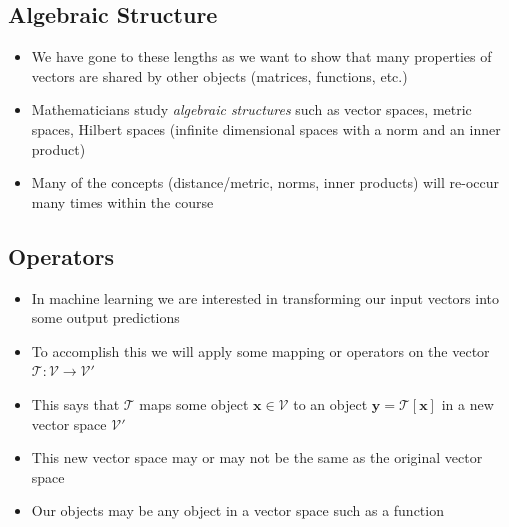 \begin{slide}
\section{Algebraic Structure}

\begin{PauseHighLight}
  \begin{itemize}
  \item We have gone to these lengths as we want to show that many
    properties of vectors are shared by other objects (matrices,
    functions, etc.)\pause
  \item Mathematicians study \textit{algebraic structures} such as
    vector spaces, metric spaces, Hilbert spaces (infinite dimensional
    spaces with a norm and an inner product)\pause
  \item Many of the concepts (distance/metric, norms, inner products)
    will re-occur many times within the course\pause
  \end{itemize}
\end{PauseHighLight}

\end{slide}

\Outline %

\begin{slide}
\section{Operators}

\begin{PauseHighLight}
  \begin{itemize}
  \item In machine learning we are interested in transforming our input
    vectors into some output predictions\pause
  \item To accomplish this we will apply some mapping or operators on
    the vector $\mathcal{T}: \mathcal{V} \rightarrow \mathcal{V}'$\pause
  \item This says that $\mathcal{T}$ maps some object
    $\bm{x}\in\mathcal{V}$ to an object $\bm{y}=\mathcal{T}[\bm{x}]$ in
    a new vector space $\mathcal{V}'$\pause
  \item This new vector space may or may not be the same as the original
    vector space\pause
  \item Our objects may be any object in a vector space such as a
    function\pause
  \end{itemize}
\end{PauseHighLight}

\end{slide}

